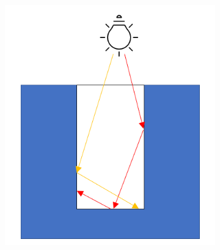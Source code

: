 \begin{figure}[H]
	\centering
	\begin{subfigure}{0.35\textwidth}
	\includegraphics[width=1\linewidth]{res/trench_with_rays.png} 
	\caption{}
	

\end{subfigure}
\end{figure}
